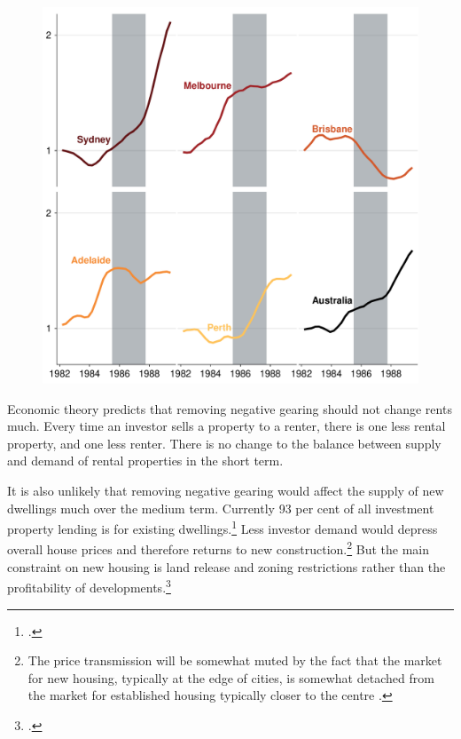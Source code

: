 \documentclass{grattan}\usepackage[]{graphicx}\usepackage[]{color}
\begin{document}
\begin{figure}
\includegraphics[width=\columnwidth]{figure/Capital_city_rents-1}
\end{figure}

Economic theory predicts that removing negative gearing should not change rents much. Every time an investor sells a property to a renter, there is one less rental property, and one less renter. There is no change to the balance between supply and demand of rental properties in the short term. 

It is also unlikely that removing negative gearing would affect the supply of new dwellings much over the medium term. Currently 93 per cent of all investment property lending is for existing dwellings.\footcite{ABS2015} Less investor demand would depress overall house prices and therefore returns to new construction.\footnote{The price transmission will be somewhat muted by the fact that the market for new housing, typically at the edge of cities, is somewhat detached from the market for established housing typically closer to the centre \textcite[See]{Kelly2011}.} But the main constraint on new housing is land release and zoning restrictions rather than the profitability of developments.\footcite[pp.84-90]{Kelly2013}
\end{document}
